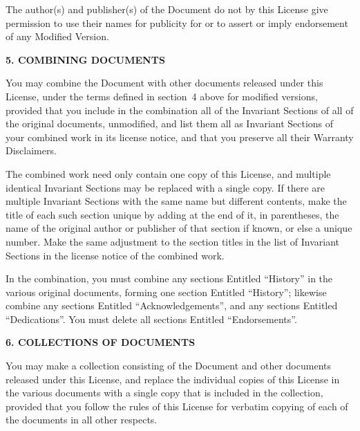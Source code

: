 \documentclass[10pt,a4paper,ngerman,titlepage,tocindentauto]{article}
\begin{document}
\begin{multicols}{3}
{					The author(s) and publisher(s) of the Document do not by this License
					give permission to use their names for publicity for or to assert or
					imply endorsement of any Modified Version.


					\begin{center}
					{\bf 5. COMBINING DOCUMENTS\par}
					\end{center}

					You may combine the Document with other documents released under this
					License, under the terms defined in section~4 above for modified
					versions, provided that you include in the combination all of the
					Invariant Sections of all of the original documents, unmodified, and
					list them all as Invariant Sections of your combined work in its
					license notice, and that you preserve all their Warranty Disclaimers.

					The combined work need only contain one copy of this License, and
					multiple identical Invariant Sections may be replaced with a single
					copy.  If there are multiple Invariant Sections with the same name but
					different contents, make the title of each such section unique by
					adding at the end of it, in parentheses, the name of the original
					author or publisher of that section if known, or else a unique number.
					Make the same adjustment to the section titles in the list of
					Invariant Sections in the license notice of the combined work.

					In the combination, you must combine any sections Entitled ``History''
					in the various original documents, forming one section Entitled
					``History''; likewise combine any sections Entitled ``Acknowledgements'',
					and any sections Entitled ``Dedications''.  You must delete all sections
					Entitled ``Endorsements''.

					\begin{center}
					{\bf 6. COLLECTIONS OF DOCUMENTS\par}
					\end{center}

					You may make a collection consisting of the Document and other documents
					released under this License, and replace the individual copies of this
					License in the various documents with a single copy that is included in
					the collection, provided that you follow the rules of this License for
					verbatim copying of each of the documents in all other respects.

}
\end{multicols}
\end{document}
